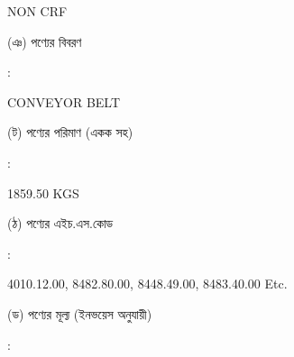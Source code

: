 \documentclass[12pt]{article}
\newcommand{\good}{CONVEYOR BELT}
\newcommand{\pkg}{1859.50 KGS}
\newcommand{\crf}{NON CRF}
\newcommand{\crfdt}{}
\newcommand{\hscode}{4010.12.00, 8482.80.00, 8448.49.00, 8483.40.00 Etc.}
\begin{document}
\begin{minipage}[t]{0.50\linewidth}
{\crf} \hspace{2em} {\crfdt}
\\
\end{minipage}
\begin{minipage}[t]{0.05\linewidth}
\hspace*{1em}
\end{minipage}
\begin{minipage}[t]{0.45\linewidth}
(ঞ) পণ্যের বিবরণ
\end{minipage}
\begin{minipage}[t]{0.02\linewidth}
:
\end{minipage}
\begin{minipage}[t]{0.50\linewidth}
{\good}
\\
\end{minipage}
\begin{minipage}[t]{0.05\linewidth}
\hspace*{1em}
\end{minipage}
\begin{minipage}[t]{0.45\linewidth}
(ট) পণ্যের পরিমাণ (একক সহ)
\end{minipage}
\begin{minipage}[t]{0.02\linewidth}
:
\end{minipage}
\begin{minipage}[t]{0.50\linewidth}
{\pkg}
\\
\end{minipage}
\begin{minipage}[t]{0.05\linewidth}
\hspace*{1em}
\end{minipage}
\begin{minipage}[t]{0.45\linewidth}
(ঠ) পণ্যের এইচ.এস.কোড
\end{minipage}
\begin{minipage}[t]{0.02\linewidth}
:
\end{minipage}
\begin{minipage}[t]{0.50\linewidth}
{\hscode}
\\
\end{minipage}
\begin{minipage}[t]{0.05\linewidth}
\hspace*{1em}
\end{minipage}
\begin{minipage}[t]{0.45\linewidth}
(ড) পণ্যের মূল্য (ইনভয়েস অনুযায়ী)
\end{minipage}
\begin{minipage}[t]{0.02\linewidth}
:
\end{minipage}
\end{document}
